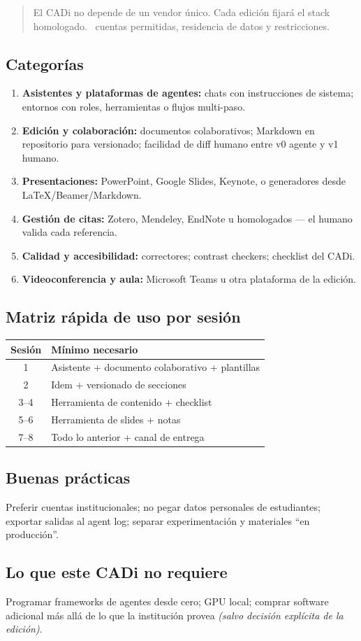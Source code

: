 
\begin{quote}
El CADi no depende de un vendor único. Cada edición fijará el stack homologado. \ceddie\ cuentas permitidas, residencia de datos y restricciones.
\end{quote}

\subsection*{Categorías}
\begin{enumerate}
\item \textbf{Asistentes y plataformas de agentes:} chats con instrucciones de sistema; entornos con roles, herramientas o flujos multi-paso.
\item \textbf{Edición y colaboración:} documentos colaborativos; Markdown en repositorio para versionado; facilidad de diff humano entre v0 agente y v1 humano.
\item \textbf{Presentaciones:} PowerPoint, Google Slides, Keynote, o generadores desde LaTeX/Beamer/Markdown.
\item \textbf{Gestión de citas:} Zotero, Mendeley, EndNote u homologados --- el humano valida cada referencia.
\item \textbf{Calidad y accesibilidad:} correctores; contrast checkers; checklist del CADi.
\item \textbf{Videoconferencia y aula:} Microsoft Teams u otra plataforma de la edición.
\end{enumerate}

\subsection*{Matriz rápida de uso por sesión}
\begin{tabularx}{\textwidth}{@{}cX@{}}
\toprule
Sesión & Mínimo necesario \\
\midrule
1 & Asistente + documento colaborativo + plantillas \\
2 & Idem + versionado de secciones \\
3--4 & Herramienta de contenido + checklist \\
5--6 & Herramienta de slides + notas \\
7--8 & Todo lo anterior + canal de entrega \\
\bottomrule
\end{tabularx}

\subsection*{Buenas prácticas}
Preferir cuentas institucionales; no pegar datos personales de estudiantes; exportar salidas al agent log; separar experimentación y materiales ``en producción''.

\subsection*{Lo que este CADi no requiere}
Programar frameworks de agentes desde cero; GPU local; comprar software adicional más allá de lo que la institución provea \textit{(salvo decisión explícita de la edición)}.
